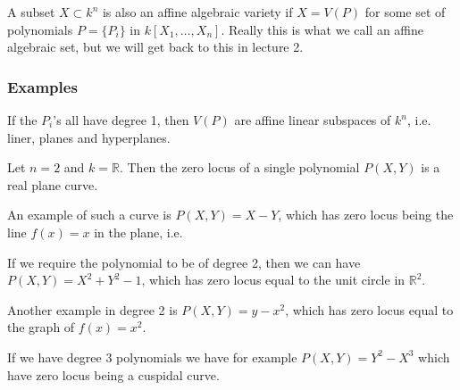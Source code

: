 A subset $X\subset k^n$ is also an affine algebraic variety if $X = V(P)$ for some set of polynomials $P=\{ P_i\}$ in $k[X_1, \ldots, X_n]$. Really this is what we call an affine algebraic set, but we will get back to this in lecture 2. 




\subsubsection*{Examples}

\begin{example}
If the $P_i$'s all have degree 1, then $V(P)$ are affine linear subspaces of $k^n$, i.e. liner, planes and hyperplanes. 
\end{example}

Let $n=2$ and $k=\mathbb{R}$. Then the zero locus of a single polynomial $P(X, Y)$ is a real plane curve. 

\begin{example}
An example of such a curve is $P(X, Y) = X-Y$, which has zero locus being the line $f(x)=x$ in the plane, i.e.
\begin{center}
\def\svgwidth{0.4\textwidth}

\end{center}
\end{example}


\begin{example}
If we require the polynomial to be of degree 2, then we can have $P(X, Y)=X^2+Y^2-1$, which has zero locus equal to the unit circle in $\mathbb{R}^2$. 
\begin{center}
\def\svgwidth{0.4\textwidth}

\end{center}
\end{example}

\begin{example}
Another example in degree 2 is $P(X, Y) = y-x^2$, which has zero locus equal to the graph of $f(x)=x^2$.
\begin{center}
\def\svgwidth{0.4\textwidth}

\end{center}
\end{example}

\begin{example}
If we have degree 3 polynomials we have for example $P(X, Y)=Y^2-X^3$ which have zero locus being a cuspidal curve.
\begin{center}
\def\svgwidth{0.4\textwidth}

\end{center}
\end{example}

